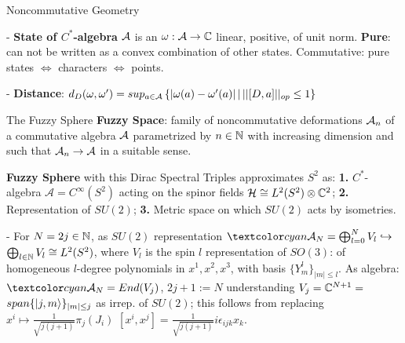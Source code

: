 \begin{frame}{Noncommutative Geometry}
\begin{equation}
    \end{equation}
    
    - \textbf{State of $C^*$-algebra} $\mathcal A$ is an $\omega : \mathcal A \to \mathbb C$ linear, positive, of unit norm. \textbf{Pure}: can not be written as a convex combination of other states. Commutative: pure states $\Longleftrightarrow$ characters $\Longleftrightarrow$ points.
    
    - \textbf{Distance}: $d_D(\omega, \omega') = sup_{a \in \mathcal A} \left\{|\omega(a) - \omega'(a)| \, | \, ||[D, a]||_{op} \leq 1 \right\}$
    
\end{frame}


\begin{frame}{The Fuzzy Sphere} %
    \textbf{Fuzzy Space}: %
    family of noncommutative deformations $\mathcal A_n$ of a commutative algebra $\mathcal A$ parametrized by $n \in \mathbb N$ with increasing dimension and such that $\mathcal A_n \to \mathcal A$ in a suitable sense.
    
    \textbf{Fuzzy Sphere} with this Dirac Spectral Triples  \cite{DAndrea2013} approximates $S^2$ as: \textbf{1.} $C^*$-algebra $\mathcal A = C^\infty(S^2)$ acting on the spinor fields $\mathcal H \cong L^2(S^2)\otimes \mathbb C^2$; \textbf{2.} Representation of $SU(2)$; \textbf{3.}  Metric space on which $SU(2)$ acts by isometries.
    
    - For $N = 2j \in \mathbb N$, as $SU(2)$ representation $\lbtext{\acal_N}= \bigoplus_{l = 0}^N V_l \hookrightarrow$ $ \bigoplus_{l \in \mathbb N} V_l \cong L^2(S^2)$, where $V_l$ is the spin $l$ representation of $SO(3)$: of homogeneous $l$-degree polynomials in $x^1, x^2, x^3$, with basis $\{Y^l_m\}_{|m| \leq l}$. As algebra: $\lbtext{\acal_N} = End(V_j)$, $2j+1 := N$ understanding $V_j= \mathbb C^{N+1} =$ $ span\{|j, m\rangle\}_{|m| \leq j}$ as irrep. of $SU(2)$; this follows from replacing $x^i \mapsto \frac{1}{\sqrt{j(j+1)}} \pi_{j}(J_i)$ \then $[x^i, x^j] = \frac{1}{\sqrt{j(j+1)}} i \epsilon_{ijk} x_k$.%
    
\end{frame}